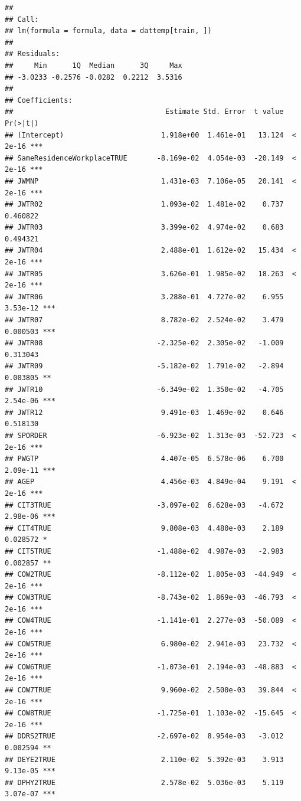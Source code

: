 \documentclass[
]{article}
\begin{document}
\begin{verbatim}
## 
## Call:
## lm(formula = formula, data = dattemp[train, ])
## 
## Residuals:
##     Min      1Q  Median      3Q     Max 
## -3.0233 -0.2576 -0.0282  0.2212  3.5316 
## 
## Coefficients:
##                                    Estimate Std. Error  t value Pr(>|t|)    
## (Intercept)                       1.918e+00  1.461e-01   13.124  < 2e-16 ***
## SameResidenceWorkplaceTRUE       -8.169e-02  4.054e-03  -20.149  < 2e-16 ***
## JWMNP                             1.431e-03  7.106e-05   20.141  < 2e-16 ***
## JWTR02                            1.093e-02  1.481e-02    0.737 0.460822    
## JWTR03                            3.399e-02  4.974e-02    0.683 0.494321    
## JWTR04                            2.488e-01  1.612e-02   15.434  < 2e-16 ***
## JWTR05                            3.626e-01  1.985e-02   18.263  < 2e-16 ***
## JWTR06                            3.288e-01  4.727e-02    6.955 3.53e-12 ***
## JWTR07                            8.782e-02  2.524e-02    3.479 0.000503 ***
## JWTR08                           -2.325e-02  2.305e-02   -1.009 0.313043    
## JWTR09                           -5.182e-02  1.791e-02   -2.894 0.003805 ** 
## JWTR10                           -6.349e-02  1.350e-02   -4.705 2.54e-06 ***
## JWTR12                            9.491e-03  1.469e-02    0.646 0.518130    
## SPORDER                          -6.923e-02  1.313e-03  -52.723  < 2e-16 ***
## PWGTP                             4.407e-05  6.578e-06    6.700 2.09e-11 ***
## AGEP                              4.456e-03  4.849e-04    9.191  < 2e-16 ***
## CIT3TRUE                         -3.097e-02  6.628e-03   -4.672 2.98e-06 ***
## CIT4TRUE                          9.808e-03  4.480e-03    2.189 0.028572 *  
## CIT5TRUE                         -1.488e-02  4.987e-03   -2.983 0.002857 ** 
## COW2TRUE                         -8.112e-02  1.805e-03  -44.949  < 2e-16 ***
## COW3TRUE                         -8.743e-02  1.869e-03  -46.793  < 2e-16 ***
## COW4TRUE                         -1.141e-01  2.277e-03  -50.089  < 2e-16 ***
## COW5TRUE                          6.980e-02  2.941e-03   23.732  < 2e-16 ***
## COW6TRUE                         -1.073e-01  2.194e-03  -48.883  < 2e-16 ***
## COW7TRUE                          9.960e-02  2.500e-03   39.844  < 2e-16 ***
## COW8TRUE                         -1.725e-01  1.103e-02  -15.645  < 2e-16 ***
## DDRS2TRUE                        -2.697e-02  8.954e-03   -3.012 0.002594 ** 
## DEYE2TRUE                         2.110e-02  5.392e-03    3.913 9.13e-05 ***
## DPHY2TRUE                         2.578e-02  5.036e-03    5.119 3.07e-07 ***

\end{verbatim}
\end{document}
